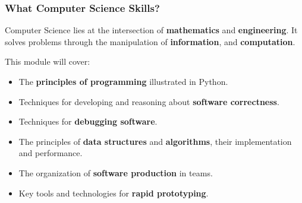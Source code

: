 \documentclass{beamer} %
\newcommand\emc[1]{\textcolor{midred}{\textbf{#1}}}
\begin{document}
\begin{frame}
\frametitle{What Computer Science Skills?} 

Computer Science lies at the intersection of \emc{mathematics} and \emc{engineering}. It solves problems through the manipulation of \emc{information}, and \emc{computation}.

\vspace{3mm}
This module will cover:
\begin{itemize}
	\item The \emc{principles of programming} illustrated in Python.
	\item Techniques for developing and reasoning about \emc{software correctness}.
        \item Techniques for \emc{debugging software}.
	\item The principles of \emc{data structures} and \emc{algorithms}, their implementation and performance.
	\item The organization of \emc{software production} in teams.
	\item Key tools and technologies for \emc{rapid prototyping}.
\end{itemize}

\end{frame}
\end{document}
